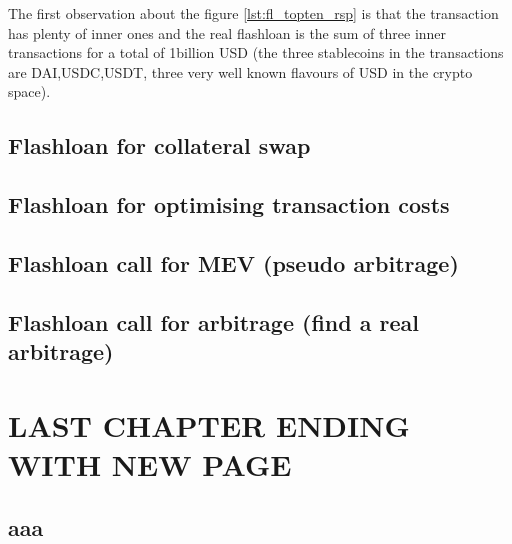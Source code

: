 \documentclass[11pt,a4paper,titlepage]{scrartcl}
\begin{document}
 The first observation about the figure \ref{lst:fl_topten_rsp}  is that the transaction has plenty of inner ones and the real flashloan is the sum of three inner transactions for a total of 1billion USD (the three stablecoins in the transactions are DAI,USDC,USDT, three very well known flavours of USD in the crypto space). 
 

\subsection{Flashloan for collateral swap}

\subsection{Flashloan for optimising transaction costs}

\subsection{Flashloan call for MEV (pseudo arbitrage)}

\subsection{Flashloan call for arbitrage (find a real arbitrage)}

\newpage


\section{LAST CHAPTER ENDING WITH NEW PAGE}
\subsection{aaa}
\end{document}
